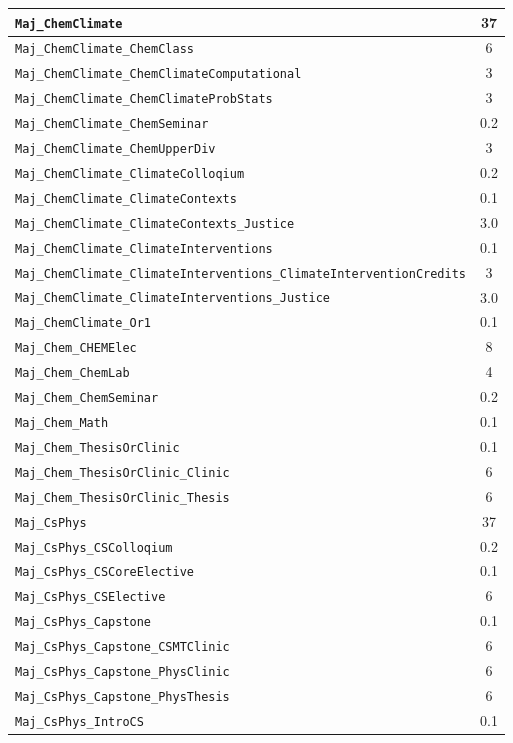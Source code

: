 \begin{longtable}{|p{}|c|}
    \verb|Maj_ChemClimate| & 37\\\hline
    \verb|Maj_ChemClimate_ChemClass| & 6\\\hline
    \verb|Maj_ChemClimate_ChemClimateComputational| & 3\\\hline
    \verb|Maj_ChemClimate_ChemClimateProbStats| & 3\\\hline
    \verb|Maj_ChemClimate_ChemSeminar| & 0.2\\\hline
    \verb|Maj_ChemClimate_ChemUpperDiv| & 3\\\hline
    \verb|Maj_ChemClimate_ClimateColloqium| & 0.2\\\hline
    \verb|Maj_ChemClimate_ClimateContexts| & 0.1\\\hline
    \verb|Maj_ChemClimate_ClimateContexts_Justice| & 3.0\\\hline
    \verb|Maj_ChemClimate_ClimateInterventions| & 0.1\\\hline
    \verb|Maj_ChemClimate_ClimateInterventions_ClimateInterventionCredits| & 3\\\hline
    \verb|Maj_ChemClimate_ClimateInterventions_Justice| & 3.0\\\hline
    \verb|Maj_ChemClimate_Or1| & 0.1\\\hline
    \verb|Maj_Chem_CHEMElec| & 8\\\hline
    \verb|Maj_Chem_ChemLab| & 4\\\hline
    \verb|Maj_Chem_ChemSeminar| & 0.2\\\hline
    \verb|Maj_Chem_Math| & 0.1\\\hline
    \verb|Maj_Chem_ThesisOrClinic| & 0.1\\\hline
    \verb|Maj_Chem_ThesisOrClinic_Clinic| & 6\\\hline
    \verb|Maj_Chem_ThesisOrClinic_Thesis| & 6\\\hline
    \verb|Maj_CsPhys| & 37\\\hline
    \verb|Maj_CsPhys_CSColloqium| & 0.2\\\hline
    \verb|Maj_CsPhys_CSCoreElective| & 0.1\\\hline
    \verb|Maj_CsPhys_CSElective| & 6\\\hline
    \verb|Maj_CsPhys_Capstone| & 0.1\\\hline
    \verb|Maj_CsPhys_Capstone_CSMTClinic| & 6\\\hline
    \verb|Maj_CsPhys_Capstone_PhysClinic| & 6\\\hline
    \verb|Maj_CsPhys_Capstone_PhysThesis| & 6\\\hline
    \verb|Maj_CsPhys_IntroCS| & 0.1\\\hline

\end{longtable}
